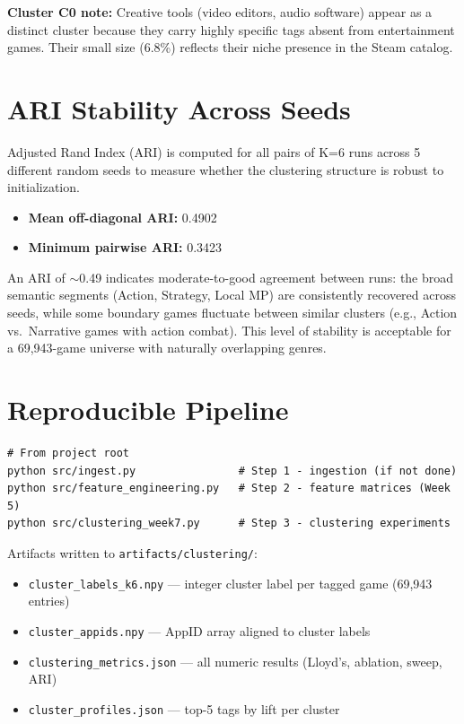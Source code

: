 \documentclass[11pt,a4paper]{article}
\begin{document}
\textbf{Cluster C0 note:} Creative tools (video editors, audio software) appear as a distinct cluster because they carry highly specific tags absent from entertainment games. Their small size (6.8\%) reflects their niche presence in the Steam catalog.

\section{ARI Stability Across Seeds}

Adjusted Rand Index (ARI) is computed for all pairs of K=6 runs across 5 different random seeds to measure whether the clustering structure is robust to initialization.

\begin{itemize}[leftmargin=*]
  \item \textbf{Mean off-diagonal ARI:} 0.4902
  \item \textbf{Minimum pairwise ARI:} 0.3423
\end{itemize}

An ARI of $\sim$0.49 indicates moderate-to-good agreement between runs: the broad semantic segments (Action, Strategy, Local MP) are consistently recovered across seeds, while some boundary games fluctuate between similar clusters (e.g., Action vs.\ Narrative games with action combat). This level of stability is acceptable for a 69,943-game universe with naturally overlapping genres.

\section{Reproducible Pipeline}

\begin{verbatim}
# From project root
python src/ingest.py                # Step 1 - ingestion (if not done)
python src/feature_engineering.py   # Step 2 - feature matrices (Week 5)
python src/clustering_week7.py      # Step 3 - clustering experiments
\end{verbatim}

Artifacts written to \texttt{artifacts/clustering/}:
\begin{itemize}[leftmargin=*]
  \item \texttt{cluster\_labels\_k6.npy} --- integer cluster label per tagged game (69,943 entries)
  \item \texttt{cluster\_appids.npy} --- AppID array aligned to cluster labels
  \item \texttt{clustering\_metrics.json} --- all numeric results (Lloyd's, ablation, sweep, ARI)
  \item \texttt{cluster\_profiles.json} --- top-5 tags by lift per cluster
\end{itemize}
\end{document}
